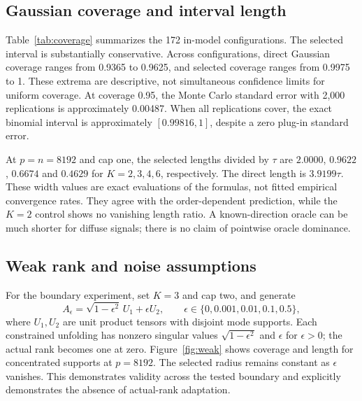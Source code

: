 \documentclass[11pt]{article}
\theoremstyle{remark}
\begin{document}
\subsection{Gaussian coverage and interval length}
Table~\ref{tab:coverage} summarizes the 172 in-model configurations. The selected interval is substantially conservative. Across configurations, direct Gaussian coverage ranges from 0.9365 to 0.9625, and selected coverage ranges from 0.9975 to 1. These extrema are descriptive, not simultaneous confidence limits for uniform coverage. At coverage 0.95, the Monte Carlo standard error with 2,000 replications is approximately 0.00487. When all replications cover, the exact binomial interval is approximately $[0.99816,1]$, despite a zero plug-in standard error.

\begin{table}[ht]
\centering

\caption{Coverage extrema over the stated Gaussian configurations. The oracle is evaluated only for nonzero rank-one signals, giving fewer configurations and a different information set. Each configuration has 2,000 replications; configuration-level uncertainty is retained in the accompanying CSV.}
\label{tab:coverage}
\end{table}

At $p=n=8192$ and cap one, the selected lengths divided by $\tau$ are $2.0000$, $0.9622$, $0.6674$ and $0.4629$ for $K=2,3,4,6$, respectively. The direct length is $3.9199\tau$. These width values are exact evaluations of the formulas, not fitted empirical convergence rates. They agree with the order-dependent prediction, while the $K=2$ control shows no vanishing length ratio. A known-direction oracle can be much shorter for diffuse signals; there is no claim of pointwise oracle dominance.

\subsection{Weak rank and noise assumptions}
For the boundary experiment, set $K=3$ and cap two, and generate
\[
 A_\epsilon=\sqrt{1-\epsilon^2}\,U_1+\epsilon U_2,
 \qquad \epsilon\in\{0,0.001,0.01,0.1,0.5\},
\]
where $U_1,U_2$ are unit product tensors with disjoint mode supports. Each constrained unfolding has nonzero singular values $\sqrt{1-\epsilon^2}$ and $\epsilon$ for $\epsilon>0$; the actual rank becomes one at zero. Figure~\ref{fig:weak} shows coverage and length for concentrated supports at $p=8192$. The selected radius remains constant as $\epsilon$ vanishes. This demonstrates validity across the tested boundary and explicitly demonstrates the absence of actual-rank adaptation.
\end{document}
